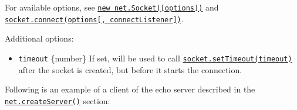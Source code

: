 For available options, see
\hyperref[new-netsocketoptions]{\texttt{new\ net.Socket({[}options{]})}}
and
\hyperref[socketconnectoptions-connectlistener]{\texttt{socket.connect(options{[},\ connectListener{]})}}.

Additional options:

\begin{itemize}
\tightlist
\item
  \texttt{timeout} \{number\} If set, will be used to call
  \hyperref[socketsettimeouttimeout-callback]{\texttt{socket.setTimeout(timeout)}}
  after the socket is created, but before it starts the connection.
\end{itemize}

Following is an example of a client of the echo server described in the
\hyperref[netcreateserveroptions-connectionlistener]{\texttt{net.createServer()}}
section:

\begin{Shaded}
\begin{Highlighting}[]
\OperatorTok{=} \NormalTok{(}\NormalTok{)}\OperatorTok{;}
\OperatorTok{=}\NormalTok{(\{ }\OperatorTok{:} \NormalTok{ \}}\OperatorTok{,}\NormalTok{ () }\KeywordTok{=\textgreater{}}\NormalTok{ \{}
  \NormalTok{(}\NormalTok{)}\OperatorTok{;}
\NormalTok{(}\StringTok{\textquotesingle{}}\NormalTok{)}\OperatorTok{;}
\NormalTok{\})}\OperatorTok{;}
\NormalTok{(}\OperatorTok{,}\KeywordTok{=\textgreater{}}\NormalTok{ \{}
  \NormalTok{())}\OperatorTok{;}
\NormalTok{()}\OperatorTok{;}
\NormalTok{\})}\OperatorTok{;}
\NormalTok{(}\OperatorTok{,}\NormalTok{ () }\KeywordTok{=\textgreater{}}\NormalTok{ \{}
  \NormalTok{(}\NormalTok{)}\OperatorTok{;}
\NormalTok{\})}\OperatorTok{;}
\end{Highlighting}
\end{Shaded}

